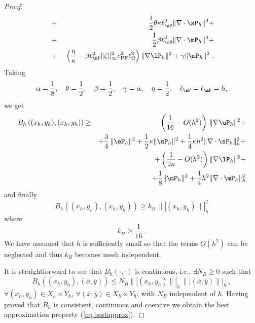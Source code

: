 \begin{proof}
\begin{eqnarray}
		~&+&~\frac12 \theta \kappa \ell_{\sP}^2 \|\nabla \cdot \sP_h\|^2 + \nonumber \\
		~&+&~\frac12 \beta \ell_{\mP}^2 \| \nabla \cdot \mP_h\|^2 + \nonumber \\
		~&+&~\left ( \frac{\eta}{\kappa}-\beta \ell_{\mP}^2 \|\zeta\|_{\infty}^2 c_{\mbox{\scriptsize{PF}}}^2 \ell_{\Omega}^2 \right ) \|\nabla \lP_h\|^2 + \gamma \|\mP_h\|^2~. \label{eq:Bhparams}
	\end{eqnarray}
	Taking
	\begin{equation}
	\alpha = \frac{1}{8}, \quad \theta=\frac12,\quad \beta=\frac12,
	\quad \gamma=\alpha, \quad \eta = \frac12,
	\quad \ell_{\sP} = \ell_{\mP} = h, \label{eq:paramsopt}
	\end{equation}
	we get
	\begin{eqnarray*}
		B_h\left ( (x_h,y_h),(x_h,y_h) \right ) &\geq  &
		\left ( \frac{1}{16} - O(h^2) \right )\, \|\nabla \uP_h\|^2+\\
		& & +\frac{3}{4}\,\|\eP_h\|^2+\frac12 \kappa \|\sP_h\|^2 + \frac14 \kappa h^2 \|\nabla \cdot \sP_h\|_h^2 + \\
		& &
		+\left (\frac{1}{2\kappa}  -O(h^2) \right ) \|\nabla \lP_h\|^2 + \\
		& & + \frac18 \|\mP_h\|^2  +\frac14 h^2 \|\nabla \cdot \mP_h\|_h^2 
	\end{eqnarray*}
	and finally
	\begin{equation}
		B_h\left ( (x_h,y_h),({x}_h,{y}_h) \right ) \geq 
		k_B \, \| |(x_h,y_h)  \| |_h^2 
	\end{equation}
	where
	\begin{equation}
		k_B \geq \frac{1}{16}~.
	\end{equation}
	We have assumed that $h$ is sufficiently small so that the terms $O(h^2)$ can be neglected and thus $k_B$ becomes mesh independent. 
	
	It is straightforward to see that $B_h(\cdot,\cdot)$ is continuous, i.e., $\exists N_B\geq 0$ such that
	\begin{equation}
		B_h\left ( (x_h,y_h),(\bar{x},\bar{y}) \right ) \leq N_B \||(x_h,y_h)\||_h\,\||(\bar{x},\bar{y})\||_h~,
	\end{equation}
	$ \forall (x_h,y_h) \in X_h\times Y_h$, $\forall (\bar{x},\bar{y})\in X_h\times Y_h$, with $N_B$ independent of $h$. Having proved that $B_h$ is consistent, continuous and coercive we obtain the best approximation property (\ref{eq:bestapprox}).
\end{proof}



